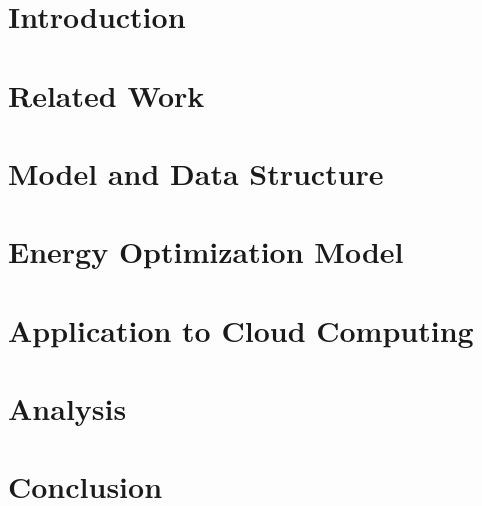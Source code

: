 \documentclass{acm_proc_article-sp}
\begin{document}

\begin{abstract}

\end{abstract}

\section{Introduction}
\label{intro}


\section{Related Work}
\label{related_work}


\section{Model and Data Structure}
\label{shadow_model}


\section{Energy Optimization Model}
\label{model}


\section{Application to Cloud Computing}
\label{application_to_cloud}


\section{Analysis}
\label{analysis}


\section{Conclusion}
\label{conclusion}



%

\end{document}
